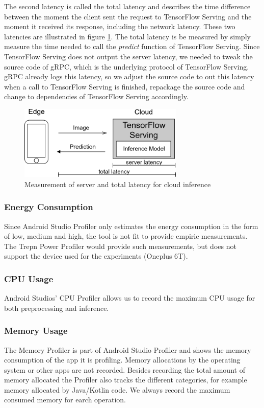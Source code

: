 The second latency is called the total latency and describes the time difference between the moment the client sent the request to TensorFlow Serving and the moment it received its response, including the network latency.
These two latencies are illustrated in figure \ref{fig:serverLat}.
The total latency is be measured by simply measure the time needed to call the \emph{predict} function of TensorFlow Serving.
Since TensorFlow Serving does not output the server latency, we needed to tweak the source code of gRPC, which is the underlying protocol of TensorFlow Serving. gRPC already logs this latency, so we adjust the source code to out this latency when a call to TensorFlow Serving is finished, repackage the source code and change to dependencies of TensorFlow Serving accordingly.
\begin{figure}[H]
\centering
\includegraphics[width=0.7\textwidth]{./Bilder/server_latency.png}
\caption{Measurement of server and total latency for cloud inference}
\label{fig:serverLat}
\end{figure}
\subsubsection{Energy Consumption}
Since Android Studio Profiler only estimates the energy consumption in the form of low, medium and high, the tool is not fit to provide empiric measurements. The Trepn Power Profiler would provide such measurements, but does not support the device used for the experiments (Oneplus 6T).
\subsubsection{CPU Usage}
Android Studios’ CPU Profiler allows us to record the maximum CPU usage for both preprocessing and inference.
\subsubsection{Memory Usage}
The Memory Profiler is part of Android Studio Profiler and shows the memory consumption of the app it is profiling. Memory allocations by the operating system or other apps are not recorded. Besides recording the total amount of memory allocated the Profiler also tracks the different categories, for example memory allocated by Java/Kotlin code. We always record the maximum consumed memory for earch operation.

